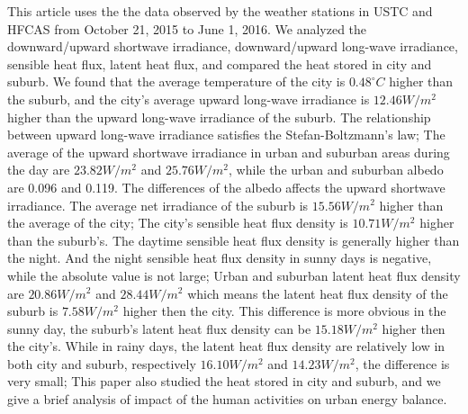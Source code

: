 \begin{enabstract}
  This article uses the the data observed by the weather stations in USTC and HFCAS from October 21, 2015 to June 1, 2016. We analyzed the downward/upward shortwave irradiance, downward/upward long-wave irradiance, sensible heat flux, latent heat flux, and compared the heat stored in city and suburb. We found that the average temperature of the city is \(0.48^{\circ}C\) higher than the suburb, and the city's average upward long-wave irradiance is \(12.46W/m^2\) higher than the upward long-wave irradiance of the suburb. The relationship between upward long-wave irradiance satisfies the Stefan-Boltzmann's law; The average of the upward shortwave irradiance in urban and suburban areas during the day are \(23.82W/m^2\) and \(25.76W/m^2\), while the urban and suburban albedo are 0.096 and 0.119. The differences of the albedo affects the upward shortwave irradiance. The average net irradiance of the suburb is \(15.56W/m^2\) higher than the average of the city; The city's sensible heat flux density is \(10.71W/m^2\) higher than the suburb's. The daytime sensible heat flux density is generally higher than the night. And the night sensible heat flux density in sunny days is negative, while the absolute value is not large; Urban and suburban latent heat flux density are \(20.86W/m^2\) and \(28.44W/m^2\) which means the latent heat flux density of the suburb is \(7.58W/m^2\) higher then the city. This difference is more obvious in the sunny day, the suburb's latent heat flux density can be \(15.18W/m^2\) higher then the city's. While in rainy days, the latent heat flux density are relatively low in both city and suburb,
respectively \(16.10W/m^2\) and \(14.23W/m^2\), the difference is very small; This paper also studied the heat stored in city and suburb, and we give a brief analysis of impact of the human activities on urban energy balance.
\end{enabstract}
